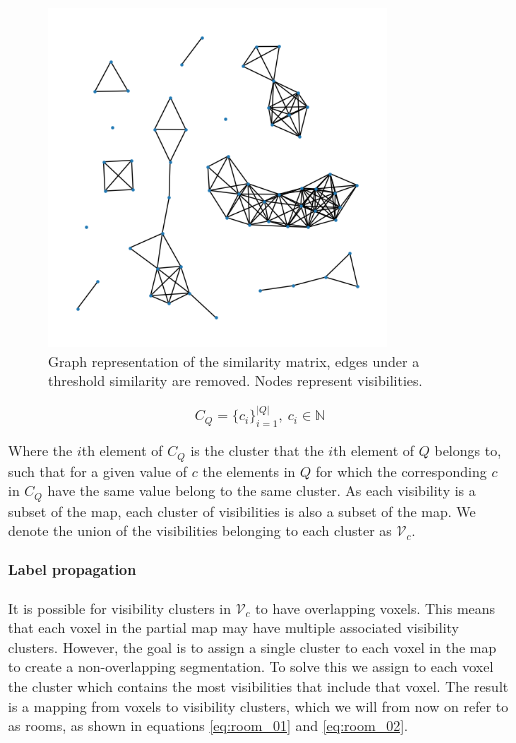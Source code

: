 \begin{figure}[h]
    \centering
    \includegraphics*[width=0.8\textwidth]{./fig/mutual_visibility_graph.png}
    \caption{Graph representation of the similarity matrix, edges under a threshold similarity are removed. Nodes represent visibilities.}
    \label{fig:similarity_graph}
\end{figure}

\begin{equation}
    \label{eq:c_visibility}
    C_{Q} = \{c_i\}_{i=1}^{|Q|},\ c_i \in \mathbb{N}
\end{equation}

Where the \(i\)th element of \(C_{Q}\) is the cluster that the \(i\)th element of \(Q\) belongs to, such that for a given value of \(c\) the elements in \(Q\) for which the corresponding \(c\) in \(C_Q\) have the same value belong to the same cluster. As each visibility is a subset of the map, each cluster of visibilities is also a subset of the map. We denote the union of the visibilities belonging to each cluster as \(\mathcal{V}_{c}\). 

\paragraph{Label propagation}
It is possible for visibility clusters in \(\mathcal{V}_{c}\) to have overlapping voxels. This means that each voxel in the partial map may have multiple associated visibility clusters. However, the goal is to assign a single cluster to each voxel in the map to create a non-overlapping segmentation. To solve this we assign to each voxel the cluster which contains the most visibilities that include that voxel. The result is a mapping from voxels to visibility clusters, which we will from now on refer to as rooms, as shown in equations \ref{eq:room_01} and \ref{eq:room_02}.

